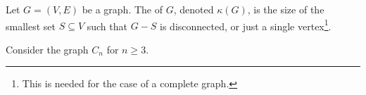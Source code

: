 \begin{definition}[Connectivity]
	Let $G = (V, E)$ be a graph. The  of $G$, denoted $\kappa(G)$, is the size of the smallest set $S \subseteq V$ such that $G - S$ is disconnected, or just a single vertex\footnote{This is needed for the case of a complete graph.}.
\end{definition}
\begin{example}[Connectivity of $C_n$]
	Consider the graph $C_n$ for $n \geq 3$.
	\begin{center}
		


\begin{tikzpicture}[x=0.75pt,y=0.75pt,yscale=-1,xscale=1]


\end{tikzpicture}
\end{center}
\end{example}
